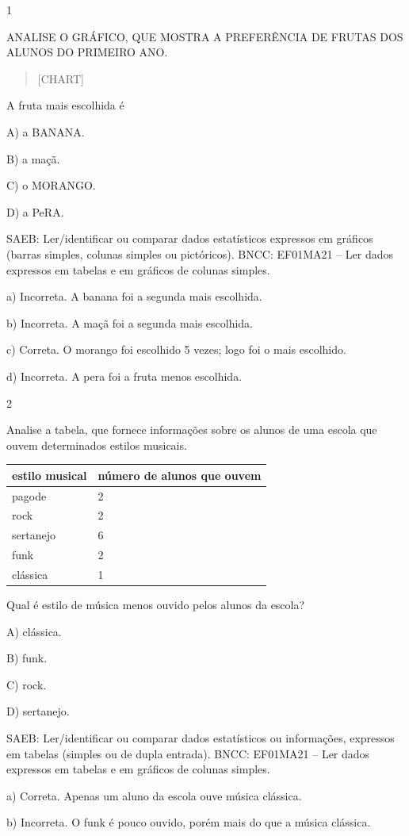 
\num{1}

ANALISE O GRÁFICO, QUE MOSTRA A PREFERÊNCIA DE FRUTAS DOS ALUNOS DO PRIMEIRO
ANO.

\begin{quote}
{{[}CHART{]}}
\end{quote}

A fruta mais escolhida é

A) a BANANA.

B) a maçã.

C) o MORANGO.

D) a PeRA.

SAEB: Ler/identificar ou comparar dados estatísticos expressos
em gráficos (barras simples, colunas simples ou pictóricos).
BNCC: EF01MA21 -- Ler dados expressos em tabelas e em gráficos de colunas
simples.

a) Incorreta. A banana foi a segunda mais escolhida.

b) Incorreta. A maçã foi a segunda mais escolhida.

c) Correta. O morango foi escolhido 5 vezes; logo foi o mais escolhido.

d) Incorreta. A pera foi a fruta menos escolhida.

\num{2}

Analise a tabela, que fornece informações sobre os alunos de uma escola que ouvem determinados estilos musicais.

\begin{longtable}[]{@{}ll@{}}
\toprule
estilo musical & número de alunos que ouvem\tabularnewline
\midrule
\endhead
pagode & 2\tabularnewline
rock & 2\tabularnewline
sertanejo & 6\tabularnewline
funk & 2\tabularnewline
clássica & 1\tabularnewline
\bottomrule
\end{longtable}

Qual é estilo de música menos ouvido pelos alunos da escola?

A) clássica.

B) funk.

C) rock.

D) sertanejo.

SAEB: Ler/identificar ou comparar dados estatísticos ou informações, expressos
em tabelas (simples ou de dupla entrada).
BNCC: EF01MA21 -- Ler dados expressos em tabelas e em gráficos de colunas
simples.

a) Correta. Apenas um aluno da escola ouve música clássica.

b) Incorreta. O funk é pouco ouvido, porém mais do que a música
clássica.

